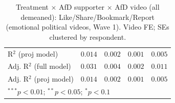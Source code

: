 \begin{table}
\begin{center}
\begin{tabular}{l c c c c}
R$^2$ (proj model)                               & $0.014$       & $0.002$       & $0.001$       & $0.005$        \\
Adj. R$^2$ (full model)                          & $0.031$       & $0.004$       & $0.002$       & $0.011$        \\
Adj. R$^2$ (proj model)                          & $0.014$       & $0.002$       & $0.001$       & $0.005$        \\
\hline
\multicolumn{5}{l}{\scriptsize{$^{***}p<0.01$; $^{**}p<0.05$; $^{*}p<0.1$}}
\end{tabular}
\caption{Treatment × AfD supporter × AfD video (all demeaned): Like/Share/Bookmark/Report (emotional political videos, Wave 1). Video FE; SEs clustered by respondent.}
\label{tab:afd_video_3way_demeaned}
\end{center}
\end{table}
